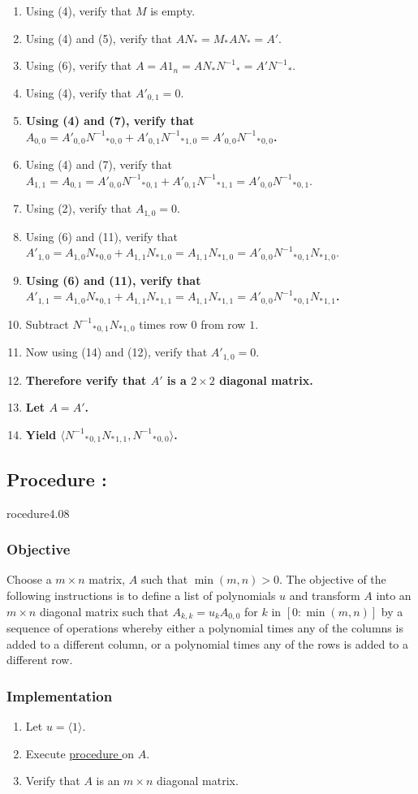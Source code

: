 \documentclass{article}
\newcounter{procedure}[part]
\newcommand{\procedure}[1]{\subsection*{Procedure \thepart:\theprocedure}\label{sec:procedure #1}\global\expandafter\edef\csname procedure#1\endcsname{\thepart:\theprocedure}\addtocounter{procedure}{1}}
\newcommand{\objective}{\subsubsection*{Objective}}
\newcommand{\implementation}{\subsubsection*{Implementation}}
\newcommand{\procedurehr}[1]{\hyperref[sec:procedure #1]{procedure \expandafter\csname procedure#1\endcsname}}
\begin{document}
\begin{multicols}{2}
\begin{enumerate}
					\item Using (4), verify that $M$ is empty.
					\item Using (4) and (5), verify that $AN_*=M_*AN_*=A'$.
					\item Using (6), verify that $A=A1_n=AN_*{N^{-1}}_*=A'{N^{-1}}_*$.
					\item Using (4), verify that $A'_{0,1}=0$.
					\item \textbf{Using (4) and (7), verify that $A_{0,0}=A'_{0,0}{{N^{-1}}_*}_{0,0}+A'_{0,1}{{N^{-1}}_*}_{1,0}=A'_{0,0}{{N^{-1}}_*}_{0,0}$.}
					\item Using (4) and (7), verify that $A_{1,1}=A_{0,1}=A'_{0,0}{{N^{-1}}_*}_{0,1}+A'_{0,1}{{N^{-1}}_*}_{1,1}=A'_{0,0}{{N^{-1}}_*}_{0,1}$.
					\item Using (2), verify that $A_{1,0}=0$.
					\item Using (6) and (11), verify that $A'_{1,0}=A_{1,0}{N_*}_{0,0}+A_{1,1}{N_*}_{1,0}=A_{1,1}{N_*}_{1,0}=A'_{0,0}{{N^{-1}}_*}_{0,1}{N_*}_{1,0}$.
					\item \textbf{Using (6) and (11), verify that $A'_{1,1}=A_{1,0}{N_*}_{0,1}+A_{1,1}{N_*}_{1,1}=A_{1,1}{N_*}_{1,1}=A'_{0,0}{{N^{-1}}_*}_{0,1}{N_*}_{1,1}$.}
					\item Subtract ${{N^{-1}}_*}_{0,1}{N_*}_{1,0}$ times row $0$ from row $1$.
					\item Now using (14) and (12), verify that $A'_{1,0}=0$.
					\item \textbf{Therefore verify that $A'$ is a $2\times 2$ diagonal matrix.}
					\item \textbf{Let $A=A'$.}
					\item \textbf{Yield $\langle{{N^{-1}}_*}_{0,1}{N_*}_{1,1},{{N^{-1}}_*}_{0,0}\rangle$.}
				\end{enumerate}
		\procedure{4.08}
			\objective
				Choose a $m\times n$ matrix, $A$ such that $\min(m,n)>0$. The objective of the following instructions is to define a list of polynomials $u$ and transform $A$ into an $m\times n$ diagonal matrix such that $A_{k,k}=u_kA_{0,0}$ for $k$ in $[0:\min(m,n)]$ by a sequence of operations whereby either a polynomial times any of the columns is added to a different column, or a polynomial times any of the rows is added to a different row.
			\implementation
				\begin{enumerate}
					\item Let $u=\langle 1\rangle$.
					\item Execute \procedurehr{4.01} on $A$.
					\item Verify that $A$ is an $m\times n$ diagonal matrix.

\end{enumerate}
\end{multicols}
\end{document}
